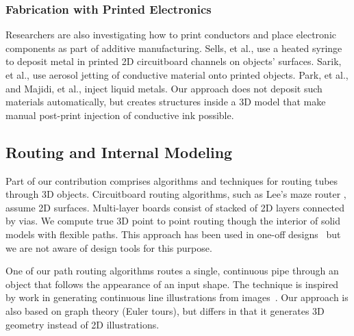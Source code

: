 \subsubsection{Fabrication with Printed Electronics}
Researchers are also investigating how to print conductors and place electronic components as part of additive manufacturing.  Sells, et al., \cite{Sells-reprap} use a heated syringe to deposit metal in printed 2D circuitboard channels on objects' surfaces.  Sarik, et al., \cite{Sarik-tracebrush} use aerosol jetting of conductive material onto printed objects.  Park, et al., \cite{Park-microchannels} and Majidi, et al., \cite{Majidi-curvature} inject liquid metals. Our approach does not deposit such materials automatically, but creates structures inside a 3D model that make manual post-print injection of conductive ink possible. 


\subsection{Routing and Internal Modeling}
Part of our contribution comprises algorithms and techniques for routing tubes through 3D objects.
Circuitboard routing algorithms, such as Lee's maze router \cite{Lee-maze}, assume 2D surfaces. Multi-layer boards consist of stacked of 2D layers connected by vias. We compute true 3D point to point routing though the interior of solid models with flexible paths. This approach has been used in one-off designs~\cite{Navarrette-gps} but we are not aware of design tools for this purpose.

One of our path routing algorithms routes a single, continuous pipe through an object that follows the appearance of an input shape. The technique is inspired by work in generating continuous line illustrations from images~\cite{Wong-continuousline,Bosch-tsp}. Our approach is also based on graph theory (Euler tours), but differs in that it generates 3D geometry instead of 2D illustrations.

